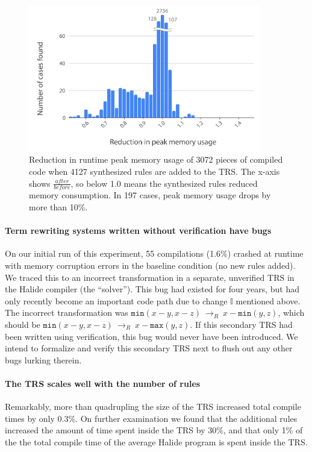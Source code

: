 \documentclass[acmsmall]{acmart}\settopmatter{}
\newcommand{\hmax}[0]{\texttt{max}}
\newcommand{\hmin}[0]{\texttt{min}}
\newcommand{\rewrites}[0]{\:\rightarrow_{R}\:}
\begin{document}
\begin{figure}
  \includegraphics[width=4in]{figures/memoryhistogram.pdf}
\caption{Reduction in runtime peak memory usage of 3072 pieces of compiled
  code when 4127 synthesized rules are added to the TRS. The x-axis
  shows $\frac{after}{before}$, so below 1.0 means the synthesized rules
  reduced memory consumption.  In 197 cases,
  peak memory usage drops by more than 10\%.}
\label{fig:peakmemoryhistogram}
\end{figure}

\paragraph{Term rewriting systems written without verification have bugs}
On our initial run of this experiment, 55 compilations (1.6\%) crashed
at runtime with memory corruption errors in the baseline condition (no
new rules added). We traced this to an incorrect transformation in a
separate, unverified TRS in the Halide compiler (the ``solver''). This
bug had existed for four years, but had only recently become an
important code path due to change $\mathbb{I}$ mentioned above. The
incorrect transformation was $\hmin(x - y, x - z) \rewrites x - \hmin(y, z)$,
which should be $\hmin(x - y, x - z) \rewrites x - \hmax(y, z)$. If this
secondary TRS had been written using verification, this bug would
never have been introduced. We intend to formalize and verify this
secondary TRS next to flush out any other bugs lurking therein.

\paragraph{The TRS scales well with the number of rules}
Remarkably, more than quadrupling the size of the TRS increased total compile
times by only 0.3\%. On further examination we found that the
additional rules increased the amount of time spent inside the TRS by
30\%, and that only 1\% of the the total compile time of the average
Halide program is spent inside the TRS.
\end{document}
